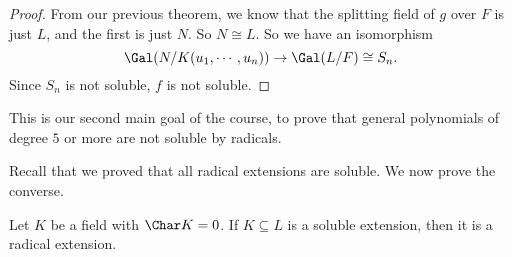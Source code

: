 \documentclass[a4paper]{article}
\begin{document}
\begin{proof}
  From our previous theorem, we know that the splitting field of $g$ over $F$ is just $L$, and the first is just $N$. So $N \cong L$. So we have an isomorphism
  \[
    \Gal(N/K(u_1, \cdots, u_n)) \to \Gal(L/F) \cong S_n.
  \]
  Since $S_n$ is not soluble, $f$ is not soluble.
\end{proof}

This is our second main goal of the course, to prove that general polynomials of degree $5$ or more are not soluble by radicals.

Recall that we proved that all radical extensions are soluble. We now prove the converse.

\begin{thm}
  Let $K$ be a field with $\Char K = 0$. If $K\subseteq L$ is a soluble extension, then it is a radical extension.
\end{thm}
\end{document}

